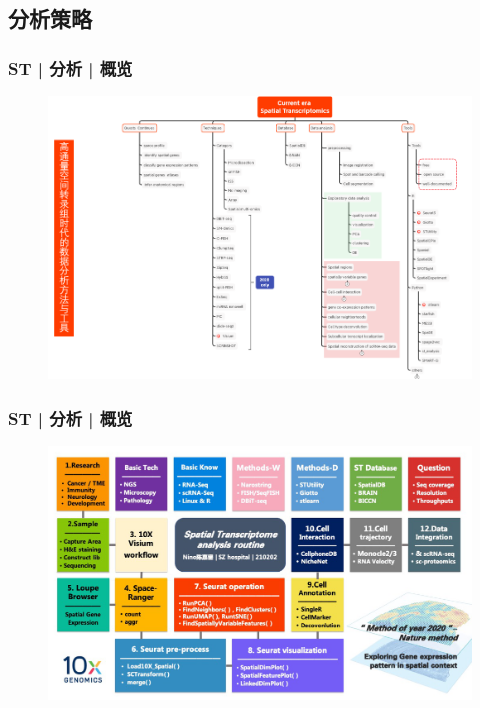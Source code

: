 \documentclass[11pt]{ctexbeamer}
\begin{document}
\subsection{分析策略}
\begin{frame}
	\frametitle{ST | 分析 | 概览}
	\begin{figure}
	\includegraphics[width=\textwidth]{ST_tools.png}
   \end{figure}
\end{frame}

\begin{frame}
	\frametitle{ST | 分析 | 概览}
	\begin{figure}
	\includegraphics[width=\textwidth]{ST_route.png}
    \end{figure}
\end{frame}
\end{document}
